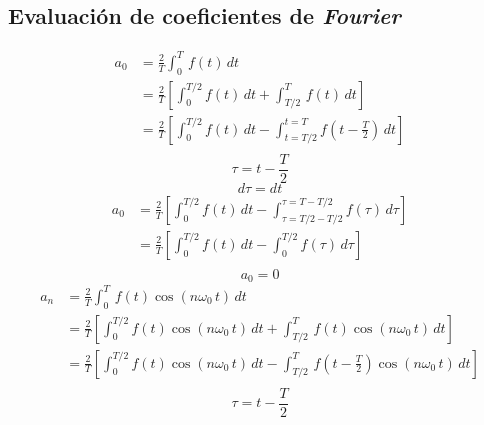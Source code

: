 \subsection{Evaluación de coeficientes de \emph{Fourier}}
\begin{equation*}
\begin{split}
    a_0
        &=\frac{2}{T}\int_0^T\,f(t)\,dt\\
        &=\frac{2}{T}\left[\int_0^{T/2}f(t)\,dt+\int_{T/2}^T\,f(t)\,dt\right]\\
        &=\frac{2}{T}\left[
            \int_0^{T/2}f(t)\,dt-\int_{t=T/2}^{t=T}f(t-\frac{T}{2})\,dt
        \right]\\
\end{split}
\end{equation*}
\begin{equation*}
    \tau=t-\frac{T}{2}
\end{equation*}
\begin{equation*}
    d\tau=dt
\end{equation*}
\begin{equation*}
\begin{split}
    a_0
        &=\frac{2}{T}\left[
            \int_0^{T/2}f(t)\,dt-
            \int_{\tau=T/2-T/2}^{\tau=T-T/2}f(\tau)\,d\tau
        \right]\\
        &=\frac{2}{T}\left[
            \int_0^{T/2}f(t)\,dt-\int_0^{T/2}f(\tau)\,d\tau
        \right]\\
\end{split}
\end{equation*}
\begin{equation}
    a_0=0
\end{equation}
\begin{equation*}
\begin{split}
    a_n
        &=\frac{2}{T}\int_0^T\,f(t)\cos(n\omega_0\,t)\,dt\\
        &=\frac{2}{T}\left[
            \int_0^{T/2}f(t)\cos(n\omega_0\,t)\,dt+
            \int_{T/2}^T\,f(t)\cos(n\omega_0\,t)\,dt
        \right]\\
        &=\frac{2}{T}\left[
            \int_0^{T/2}f(t)\cos(n\omega_0\,t)\,dt-
            \int_{T/2}^T\,f(t-\frac{T}{2})\cos(n\omega_0\,t)\,dt
        \right]\\
\end{split}
\end{equation*}
\begin{equation*}
    \tau=t-\frac{T}{2}
\end{equation*}
